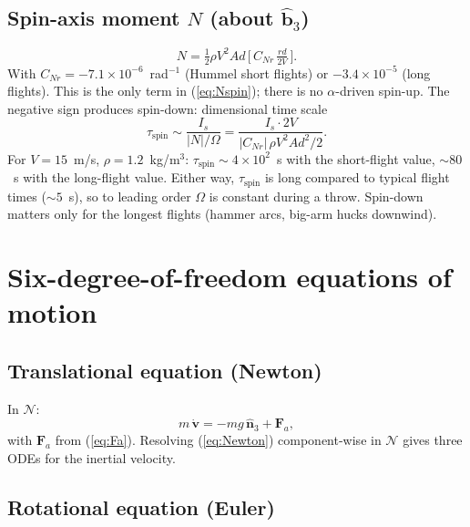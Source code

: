 \documentclass[11pt,letterpaper]{article}
\begin{document}
\subsection{Spin-axis moment $N$ (about $\hat{\mathbf{b}}_3$)}

\begin{equation}
N = \tfrac{1}{2}\rho V^2 A d\,\Big[\,C_{Nr}\,\tfrac{r d}{2V}\,\Big].
\label{eq:Nspin}
\end{equation}
With $C_{Nr} = -7.1\times10^{-6}$~rad$^{-1}$ (Hummel short flights) or $-3.4\times10^{-5}$ (long flights). This is the only term in (\ref{eq:Nspin}); there is no $\alpha$-driven spin-up. The negative sign produces spin-down: dimensional time scale
\begin{equation}
\tau_{\text{spin}} \sim \frac{I_s}{|N|/\Omega} = \frac{I_s \cdot 2V}{|C_{Nr}|\,\rho V^2 A d^2 / 2}.
\label{eq:tauspin}
\end{equation}
For $V = 15$~m/s, $\rho = 1.2$~kg/m$^3$: $\tau_{\text{spin}} \sim 4\times10^2$~s with the short-flight value, $\sim 80$~s with the long-flight value. Either way, $\tau_{\text{spin}}$ is long compared to typical flight times ($\sim 5$~s), so to leading order $\Omega$ is constant during a throw. Spin-down matters only for the longest flights (hammer arcs, big-arm hucks downwind).

\section{Six-degree-of-freedom equations of motion}
\label{sec:6dof}

\subsection{Translational equation (Newton)}

In $\mathcal{N}$:
\begin{equation}
m\,\dot{\mathbf{v}} = -m g\,\hat{\mathbf{n}}_3 + \mathbf{F}_a,
\label{eq:Newton}
\end{equation}
with $\mathbf{F}_a$ from (\ref{eq:Fa}). Resolving (\ref{eq:Newton}) component-wise in $\mathcal{N}$ gives three ODEs for the inertial velocity.

\subsection{Rotational equation (Euler)}
\end{document}
